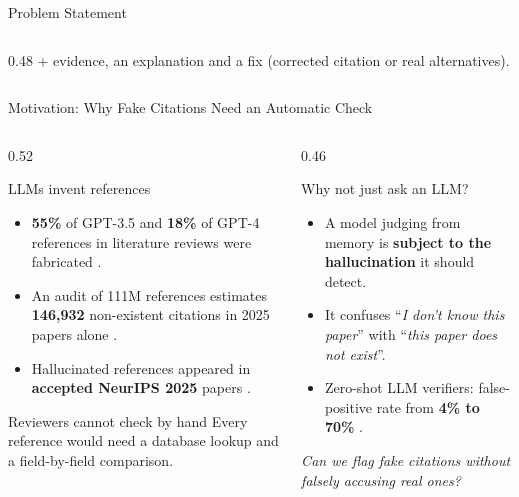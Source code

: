 \documentclass[aspectratio=169,10pt]{beamer}
\newcommand{\hl}[1]{\textcolor{accentblue}{\textbf{#1}}}
\begin{document}
\begin{frame}{Problem Statement}
\begin{columns}[T]
\begin{column}{0.48\textwidth}
      \small + evidence, an explanation and a fix (corrected citation or real alternatives).
    \end{column}
  \end{columns}
\end{frame}

\begin{frame}{Motivation: Why Fake Citations Need an Automatic Check}
  \begin{columns}[T]
    \begin{column}{0.52\textwidth}
      \begin{block}{LLMs invent references}
        \small
        \begin{itemize}
          \item \hl{55\%} of GPT-3.5 and \hl{18\%} of GPT-4 references in literature reviews were
                fabricated \cite{walters}.
          \item An audit of 111M references estimates \hl{146,932} non-existent citations in 2025
                papers alone \cite{zhao}.
          \item Hallucinated references appeared in \hl{accepted NeurIPS 2025} papers \cite{hallmark}.
        \end{itemize}
      \end{block}
      \begin{block}{Reviewers cannot check by hand}
        \small Every reference would need a database lookup and a field-by-field comparison.
      \end{block}
    \end{column}
    \begin{column}{0.46\textwidth}
      \begin{alertblock}{Why not just ask an LLM?}
        \small
        \begin{itemize}
          \item A model judging from memory is \hl{subject to the hallucination} it should detect.
          \item It confuses ``\emph{I don't know this paper}'' with ``\emph{this paper does not
                exist}''.
          \item Zero-shot LLM verifiers: false-positive rate from \hl{4\% to 70\%} \cite{hallmark}.
        \end{itemize}
      \end{alertblock}
      \vspace{2pt}
      \begin{center}
        \small\textit{Can we flag fake citations without\\ falsely accusing real ones?}
      \end{center}
    \end{column}
  \end{columns}
\end{frame}
\end{document}
